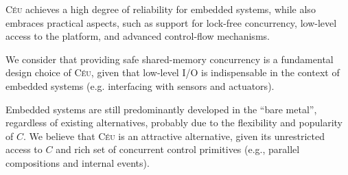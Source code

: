 \documentclass[preprint]{sigplanconf}
\newcommand{\CEU}{\textsc{C\'{e}u}\xspace}
\newcommand{\1}{\;}
\newcommand{\2}{\;\;}
\newcommand{\3}{\;\;\;}
\newcommand{\5}{\;\;\;\;\;}
\begin{document}
\CEU achieves a high degree of reliability for embedded systems, while also 
embraces practical aspects, such as support for lock-free concurrency, 
low-level access to the platform, and advanced control-flow mechanisms.

We consider that providing safe shared-memory concurrency is a fundamental 
design choice of \CEU, given that low-level I/O is indispensable in the context 
of embedded systems (e.g. interfacing with sensors and actuators).

Embedded systems are still predominantly developed in the ``bare metal'', 
regardless of existing alternatives, probably due to the flexibility and 
popularity of $C$.
We believe that \CEU is an attractive alternative, given its unrestricted 
access to $C$ and rich set of concurrent control primitives (e.g., parallel 
compositions and internal events).



\end{document}
